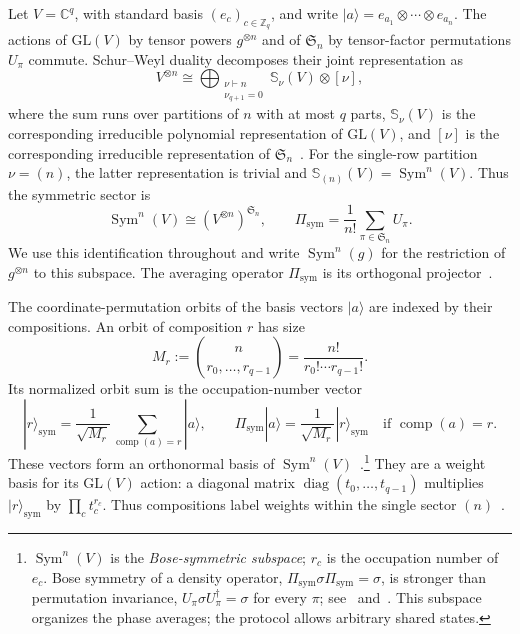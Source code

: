 \documentclass[11pt,a4paper]{article}
\numberwithin{equation}{section}
\numberwithin{figure}{section}
\numberwithin{table}{section}
\numberwithin{footnote}{section}
\theoremstyle{informal}\newtheorem*{informaltheorem}{Informal theorem}
\theoremstyle{definition}\newtheorem{example}{Example}[section]
\theoremstyle{remark}\newtheorem{remark}[theorem]{Remark}
\newcommand{\Z}{\mathbb Z}
\newcommand{\C}{\mathbb C}
\newcommand{\mult}[2]{\binom{#1}{#2}}
\begin{document}
Let \(V=\C^q\), with standard basis \((e_c)_{c\in\Z_q}\), and
write \(|a\rangle=e_{a_1}\otimes\cdots\otimes e_{a_n}\).
The actions of \(\mathrm{GL}(V)\) by tensor powers \(g^{\otimes n}\)
and of \(\mathfrak S_n\) by tensor-factor permutations \(U_\pi\)
commute. Schur--Weyl duality decomposes their joint representation as
\begin{equation}
 V^{\otimes n}\cong
 \bigoplus_{\substack{\nu\vdash n\\\nu_{q+1}=0}}
       \mathbb S_\nu(V)\otimes[\nu],
\end{equation}
where the sum runs over partitions of \(n\) with at most \(q\)
parts, \(\mathbb S_\nu(V)\) is the corresponding irreducible
polynomial representation of \(\mathrm{GL}(V)\), and \([\nu]\)
is the corresponding irreducible representation of
\(\mathfrak S_n\)~\cite[App.~E, Proposition~E.8]{zkfb}.
For the single-row partition \(\nu=(n)\), the latter representation
is trivial and \(\mathbb S_{(n)}(V)=\operatorname{Sym}^n(V)\).
Thus the symmetric sector is
\begin{equation}
 \operatorname{Sym}^n(V)\cong(V^{\otimes n})^{\mathfrak S_n},
 \qquad
 \Pi_{\mathrm{sym}}=\frac1{n!}\sum_{\pi\in\mathfrak S_n}U_\pi.
\end{equation}
We use this identification throughout and write
\(\operatorname{Sym}^n(g)\) for the restriction of
\(g^{\otimes n}\) to this subspace. The averaging operator
\(\Pi_{\mathrm{sym}}\) is its orthogonal
projector~\cite[Sec.~1, Proposition~1]{harrow-sym}.

The coordinate-permutation orbits of the basis vectors \(|a\rangle\)
are indexed by their compositions. An orbit of composition \(r\)
has size
\begin{equation}
 M_r:=\mult n{r_0,\ldots,r_{q-1}}
     =\frac{n!}{r_0!\cdots r_{q-1}!}.
\end{equation}
Its normalized orbit sum is the occupation-number vector
\begin{equation}\label{eq:occupation-basis}
 |r\rangle_{\mathrm{sym}}
 =\frac1{\sqrt{M_r}}\sum_{\operatorname{comp}(a)=r}|a\rangle,
 \qquad
 \Pi_{\mathrm{sym}}|a\rangle
 =\frac1{\sqrt{M_r}}|r\rangle_{\mathrm{sym}}
 \quad\text{if }\operatorname{comp}(a)=r.
\end{equation}
These vectors form an orthonormal basis of
\(\operatorname{Sym}^n(V)\)~\cite[Sec.~1, Theorem~3]{harrow-sym}.\footnote{%
\(\operatorname{Sym}^n(V)\) is the \emph{Bose-symmetric subspace};
\(r_c\) is the occupation number of \(e_c\).
Bose symmetry of a density operator,
\(\Pi_{\mathrm{sym}}\sigma\Pi_{\mathrm{sym}}=\sigma\), is stronger
than permutation invariance,
\(U_\pi\sigma U_\pi^\dagger=\sigma\) for every \(\pi\);
see~\cite[Sec.~II.B]{ckmr} and~\cite[Sec.~5.2, Definitions~5.1--5.2
and Proposition~5.5]{zkfb}.
This subspace organizes the phase averages; the protocol allows
arbitrary shared states.}
They are a weight basis for its \(\mathrm{GL}(V)\) action: a
diagonal matrix \(\operatorname{diag}(t_0,\ldots,t_{q-1})\)
multiplies \(|r\rangle_{\mathrm{sym}}\) by
\(\prod_c t_c^{r_c}\). Thus compositions label weights within
the single sector \((n)\)~\cite[Sec.~6, Eq.~(6.7)]{zkfb}.
\end{document}
